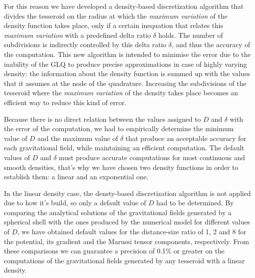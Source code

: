 \documentclass[extra]{gji}
\begin{document}
For this reason we have developed a density-based discretization algorithm that
divides the tesseroid on the radius at which the \emph{maximum variation} of
the density function takes place, only if a certain inequation that relates
this \emph{maximum variation} with a predefined delta ratio $\delta$ holds.
The number of subdivisions is indirectly controlled by this delta
ratio $\delta$, and thus the accuracy of the computation.
This new algorithm is intended to minimise the error due to the inability of
the GLQ to produce precise approximations in case of highly varying density:
the information about the density function is summed up with the values that
it assumes at the node of the quadrature.
Increasing the subdivisions of the tesseroid where the \emph{maximum
variation} of the density takes place becomes an efficient way to reduce this
kind of error.

Because there is no direct relation between the values assigned to $D$ and
$\delta$ with the error of the computation, we had to empirically determine
the minimum value of $D$ and the maximum value of $\delta$ that produce an
acceptable accuracy for each gravitational field, while maintaining an
efficient computation.
The default values of $D$ and $\delta$ must produce accurate computations for
most continuous and smooth densities, that's why we have chosen two density
functions in order to establish them: a linear and an exponential one.

In the linear density case, the densty-based discretization algorithm is not
applied due to how it's build, so only a default value of $D$ had to be
determined.
By comparing the analytical solutions of the gravitational fields generated by
a spherical shell with the ones produced by the numerical model for different
values of $D$, we have obtained default values for the distance-size ratio of
1, 2 and 8 for the potential, its gradient and the Marussi tensor components,
respectively.
From these comparisons we can guarantee a precision of 0.1\% or greater on the
computations of the gravitational fields generated by any tesseroid with a
linear density.
\end{document}
